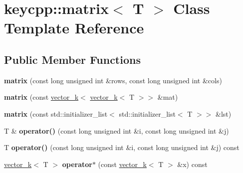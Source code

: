 \hypertarget{classkeycpp_1_1matrix}{\section{keycpp\-:\-:matrix$<$ T $>$ Class Template Reference}
\label{classkeycpp_1_1matrix}
}
\subsection*{Public Member Functions}
\begin{DoxyCompactItemize}
\item 
\hypertarget{classkeycpp_1_1matrix_a5a24003e2c33f18b3f854bab4d68db7f}{{\bfseries matrix} (const long unsigned int \&rows, const long unsigned int \&cols)}\label{classkeycpp_1_1matrix_a5a24003e2c33f18b3f854bab4d68db7f}

\item 
\hypertarget{classkeycpp_1_1matrix_a0a591c69e753fe21b73031192d8b7209}{{\bfseries matrix} (const \hyperlink{classkeycpp_1_1vector__k}{vector\-\_\-k}$<$ \hyperlink{classkeycpp_1_1vector__k}{vector\-\_\-k}$<$ T $>$$>$ \&mat)}\label{classkeycpp_1_1matrix_a0a591c69e753fe21b73031192d8b7209}

\item 
\hypertarget{classkeycpp_1_1matrix_ad8797411bc30cc0d42e0e9b8bcc899d7}{{\bfseries matrix} (const std\-::initializer\-\_\-list$<$ std\-::initializer\-\_\-list$<$ T $>$$>$ \&lst)}\label{classkeycpp_1_1matrix_ad8797411bc30cc0d42e0e9b8bcc899d7}

\item 
\hypertarget{classkeycpp_1_1matrix_a7ac2b9bb6b42468e63cce8bd527811fb}{T \& {\bfseries operator()} (const long unsigned int \&i, const long unsigned int \&j)}\label{classkeycpp_1_1matrix_a7ac2b9bb6b42468e63cce8bd527811fb}

\item 
\hypertarget{classkeycpp_1_1matrix_a8fd3fc1c1f75f80e37637bc10c3d8aa0}{T {\bfseries operator()} (const long unsigned int \&i, const long unsigned int \&j) const }\label{classkeycpp_1_1matrix_a8fd3fc1c1f75f80e37637bc10c3d8aa0}

\item 
\hypertarget{classkeycpp_1_1matrix_a02963edbfa5435269e367e12fb2cdd59}{\hyperlink{classkeycpp_1_1vector__k}{vector\-\_\-k}$<$ T $>$ {\bfseries operator$\ast$} (const \hyperlink{classkeycpp_1_1vector__k}{vector\-\_\-k}$<$ T $>$ \&x) const }\label{classkeycpp_1_1matrix_a02963edbfa5435269e367e12fb2cdd59}


\end{DoxyCompactItemize}
